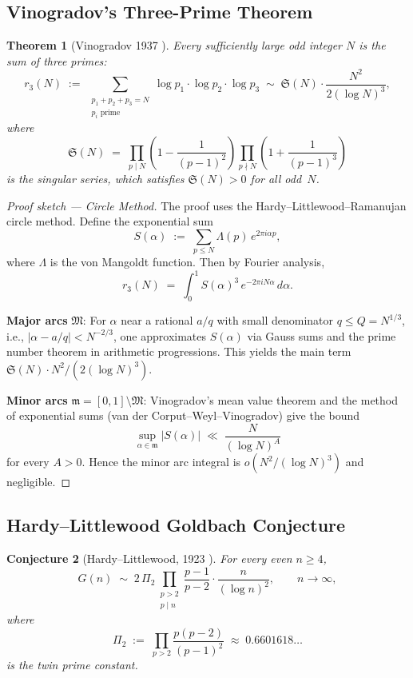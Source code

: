 \documentclass[12pt,a4paper]{amsart}
\newtheorem{theorem}{Theorem}[section]
\newtheorem{conjecture}[theorem]{Conjecture}
\theoremstyle{definition}
\newcommand{\abs}[1]{\left|#1\right|}
\begin{document}
\subsection{Vinogradov's Three-Prime Theorem}

\begin{theorem}[Vinogradov 1937 \cite{Vinogradov1937}]\label{thm:vinogradov}
Every sufficiently large odd integer $N$ is the sum of three primes:
\[
  r_3(N) \;:=\; \sum_{\substack{p_1 + p_2 + p_3 = N \\ p_i \text{ prime}}}
  \log p_1 \cdot \log p_2 \cdot \log p_3
  \;\sim\;
  \mathfrak{S}(N) \cdot \frac{N^2}{2(\log N)^3},
\]
where
\[
  \mathfrak{S}(N) \;=\;
  \prod_{p \mid N} \left(1 - \frac{1}{(p-1)^2}\right)
  \prod_{p \nmid N} \left(1 + \frac{1}{(p-1)^3}\right)
\]
is the \emph{singular series}, which satisfies $\mathfrak{S}(N) > 0$
for all odd~$N$.
\end{theorem}

\begin{proof}[Proof sketch --- Circle Method]
The proof uses the Hardy--Littlewood--Ramanujan circle method.  Define
the exponential sum
\[
  S(\alpha) \;:=\; \sum_{p \leq N} \Lambda(p)\, e^{2\pi i \alpha p},
\]
where $\Lambda$ is the von Mangoldt function.  Then by Fourier analysis,
\[
  r_3(N) \;=\; \int_0^1 S(\alpha)^3\, e^{-2\pi i N \alpha}\, d\alpha.
\]

\textbf{Major arcs} $\mathfrak{M}$: For $\alpha$ near a rational $a/q$
with small denominator $q \leq Q = N^{1/3}$, i.e.,
$\abs{\alpha - a/q} < N^{-2/3}$, one approximates $S(\alpha)$ via
Gauss sums and the prime number theorem in arithmetic progressions.
This yields the main term $\mathfrak{S}(N) \cdot N^2 / (2(\log N)^3)$.

\textbf{Minor arcs} $\mathfrak{m} = [0,1] \setminus \mathfrak{M}$:
Vinogradov's mean value theorem and the method of exponential sums
(van der Corput--Weyl--Vinogradov) give the bound
\[
  \sup_{\alpha \in \mathfrak{m}} |S(\alpha)| \;\ll\; \frac{N}{(\log N)^A}
\]
for every $A > 0$.  Hence the minor arc integral is
$o\!\left(N^2/(\log N)^3\right)$ and negligible.
\end{proof}

\subsection{Hardy--Littlewood Goldbach Conjecture}

\begin{conjecture}[Hardy--Littlewood, 1923 \cite{HardyLittlewood1923}]
\label{conj:hardy-littlewood}
For every even $n \geq 4$,
\[
  G(n) \;\sim\; 2\,\Pi_2
  \prod_{\substack{p > 2 \\ p \mid n}}
  \frac{p-1}{p-2}
  \cdot \frac{n}{(\log n)^2}, \qquad n \to \infty,
\]
where
\[
  \Pi_2 \;:=\; \prod_{p > 2} \frac{p(p-2)}{(p-1)^2}
        \;\approx\; 0.6601618\ldots
\]
is the \emph{twin prime constant}.
\end{conjecture}
\end{document}
